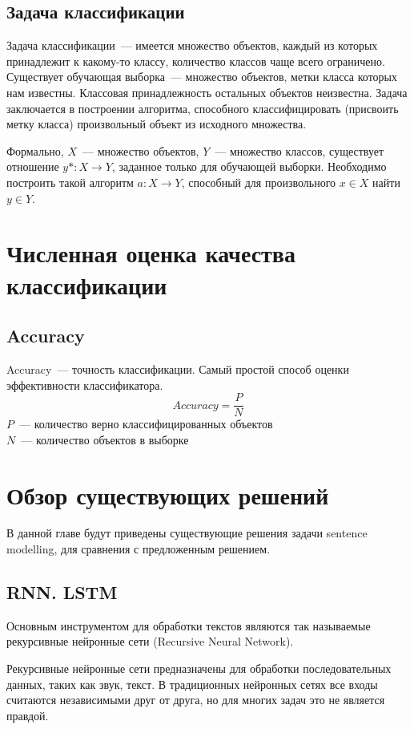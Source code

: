 \subsection{Задача классификации}

Задача классификации~--- имеется множество объектов, каждый из которых принадлежит
к какому-то классу, количество классов чаще всего ограничено.
Существует обучающая выборка~--- множество объектов, метки
класса которых нам известны. Классовая принадлежность остальных объектов
неизвестна. Задача заключается в построении алгоритма, способного
классифицировать (присвоить метку класса) произвольный объект из исходного множества.

Формально, $X$~--- множество объектов, $Y$~--- множество классов,
существует отношение $y* : X \rightarrow Y$, заданное только для обучающей выборки.
Необходимо построить такой алгоритм $a: X \rightarrow Y$, способный для произвольного
$x \in X$ найти $y \in Y$.	

\section{Численная оценка качества классификации}

\subsection{Accuracy}
Accuracy~--- точность классификации. Самый простой способ оценки эффективности классификатора.
$$Accuracy =\frac{P}{N}$$
$P$~--- количество верно классифицированных объектов\\
$N$~--- количество объектов в выборке

\section{Обзор существующих решений}

В данной главе будут приведены существующие решения задачи sentence modelling, для сравнения с предложенным решением.


\subsection{RNN. LSTM}
Основным инструментом для обработки текстов являются так называемые рекурсивные нейронные сети (Recursive Neural Network).

Рекурсивные нейронные сети предназначены для обработки последовательных данных, таких как звук, текст. В традиционных нейронных сетях все входы считаются независимыми друг от друга, но для многих задач это не является правдой.

